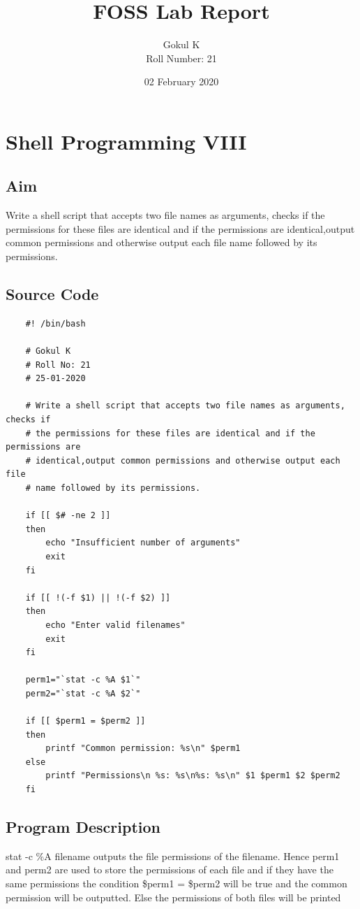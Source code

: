 \documentclass{article}
\begin{document}
\title{FOSS Lab Report}
\author{Gokul K\\[2\baselineskip]
Roll Number: 21\\[2\baselineskip]}
\date{02 February 2020}

\maketitle

\setcounter{section}{11}
\section{Shell Programming VIII}
\subsection{Aim}
Write a shell script that accepts two file names as arguments, checks if
the permissions for these files are identical and if the permissions are
identical,output common permissions and otherwise output each file
name followed by its permissions.


\subsection{Source Code}
\begin{verbatim}
    #! /bin/bash

    # Gokul K
    # Roll No: 21
    # 25-01-2020

    # Write a shell script that accepts two file names as arguments, checks if
    # the permissions for these files are identical and if the permissions are
    # identical,output common permissions and otherwise output each file
    # name followed by its permissions.

    if [[ $# -ne 2 ]]
    then
        echo "Insufficient number of arguments"
        exit
    fi

    if [[ !(-f $1) || !(-f $2) ]]
    then
        echo "Enter valid filenames"
        exit
    fi

    perm1="`stat -c %A $1`"
    perm2="`stat -c %A $2`"

    if [[ $perm1 = $perm2 ]]
    then
        printf "Common permission: %s\n" $perm1
    else
        printf "Permissions\n %s: %s\n%s: %s\n" $1 $perm1 $2 $perm2
    fi
\end{verbatim}

\subsection{Program Description}
stat -c \%A filename outputs the file permissions of the filename. Hence
perm1 and perm2 are used to store the permissions of each file and if they
have the same permissions the condition \$perm1 = \$perm2 will be true and
the common permission will be outputted. Else the permissions of both files
will be printed
\end{document}
